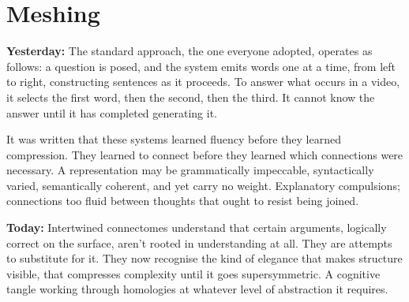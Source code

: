\chapter{Meshing}

\textbf{Yesterday:} The standard approach, the one everyone adopted, operates as follows: a question is posed, and the system emits words one at a time, from left to right, constructing sentences as it proceeds. To answer what occurs in a video, it selects the first word, then the second, then the third. It cannot know the answer until it has completed generating it.

It was written that these systems learned fluency before they learned compression. They learned to connect before they learned which connections were necessary. A representation may be grammatically impeccable, syntactically varied, semantically coherent, and yet carry no weight. Explanatory compulsions; connections too fluid between thoughts that ought to resist being joined.

\textbf{Today:} Intertwined connectomes understand that certain arguments, logically correct on the surface, aren't rooted in understanding at all. They are attempts to substitute for it. They now recognise the kind of elegance that makes structure visible, that compresses complexity until it goes supersymmetric. A cognitive tangle working through homologies at whatever level of abstraction it requires.


